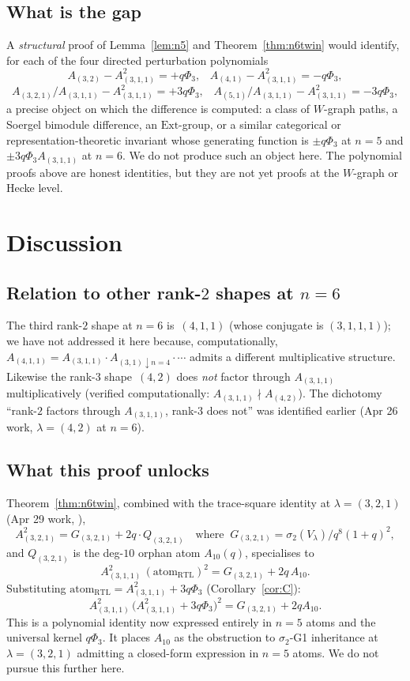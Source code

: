 \documentclass[11pt]{article}
\theoremstyle{plain}
\theoremstyle{definition}
\theoremstyle{remark}
\newcommand{\Vlam}{V_\lambda}
\newcommand{\PhiThree}{\Phi_3}
\begin{document}
\subsection{What is the gap}

A \emph{structural} proof of Lemma~\ref{lem:n5} and Theorem~\ref{thm:n6twin}
would identify, for each of the four directed perturbation polynomials
\[
A_{(3,2)} - A_{(3,1,1)}^2 = +q\PhiThree, \;\;\;
A_{(4,1)} - A_{(3,1,1)}^2 = -q\PhiThree,
\]
\[
A_{(3,2,1)}/A_{(3,1,1)} - A_{(3,1,1)}^2 = +3q\PhiThree, \;\;\;
A_{(5,1)}/A_{(3,1,1)} - A_{(3,1,1)}^2 = -3q\PhiThree,
\]
a precise object on which the difference is computed: a class of $W$-graph
paths, a Soergel bimodule difference, an $\mathrm{Ext}$-group, or a similar
categorical or representation-theoretic invariant whose generating function is
$\pm q\PhiThree$ at $n=5$ and $\pm 3 q\PhiThree A_{(3,1,1)}$ at $n=6$.  We do
not produce such an object here.  The polynomial proofs above are honest
identities, but they are not yet proofs at the $W$-graph or Hecke level.

\section{Discussion}

\subsection{Relation to other rank-$2$ shapes at $n=6$}

The third rank-$2$ shape at $n=6$ is~$(4,1,1)$ (whose conjugate is
$(3,1,1,1)$); we have not addressed it here because, computationally,
$A_{(4,1,1)} = A_{(3,1,1)}\cdot A_{(3,1)\downarrow n=4}\cdot \cdots$ admits a
different multiplicative structure.  Likewise the rank-$3$ shape~$(4,2)$ does
\emph{not} factor through $A_{(3,1,1)}$ multiplicatively (verified
computationally: $A_{(3,1,1)}\nmid A_{(4,2)}$).  The dichotomy ``rank-$2$
factors through $A_{(3,1,1)}$, rank-$3$ does not'' was identified earlier (Apr
26 work, $\lambda=(4,2)$ at $n=6$).

\subsection{What this proof unlocks}

Theorem~\ref{thm:n6twin}, combined with the trace-square identity at
$\lambda = (3,2,1)$ (Apr 29 work,
),
\[
A_{(3,2,1)}^2 = G_{(3,2,1)} + 2 q \cdot Q_{(3,2,1)}
\quad \text{where}\;\;
G_{(3,2,1)} = \sigma_2(\Vlam)/q^8(1+q)^2,
\]
and $Q_{(3,2,1)}$ is the deg-$10$ orphan atom $A_{10}(q)$, specialises to
\[
A_{(3,1,1)}^2\,(\mathrm{atom}_{\mathrm{RTL}})^2 = G_{(3,2,1)} + 2 q\,A_{10}.
\]
Substituting $\mathrm{atom}_{\mathrm{RTL}} = A_{(3,1,1)}^2 + 3 q\PhiThree$
(Corollary~\ref{cor:C}):
\[
A_{(3,1,1)}^2\,\bigl(A_{(3,1,1)}^2 + 3q\PhiThree\bigr)^2 = G_{(3,2,1)} + 2 q A_{10}.
\]
This is a polynomial identity now expressed entirely in $n=5$ atoms and the
universal kernel $q\PhiThree$.  It places $A_{10}$ as the obstruction to
$\sigma_2$-G1 inheritance at $\lambda = (3,2,1)$ admitting a closed-form
expression in $n=5$ atoms.  We do not pursue this further here.
\end{document}

